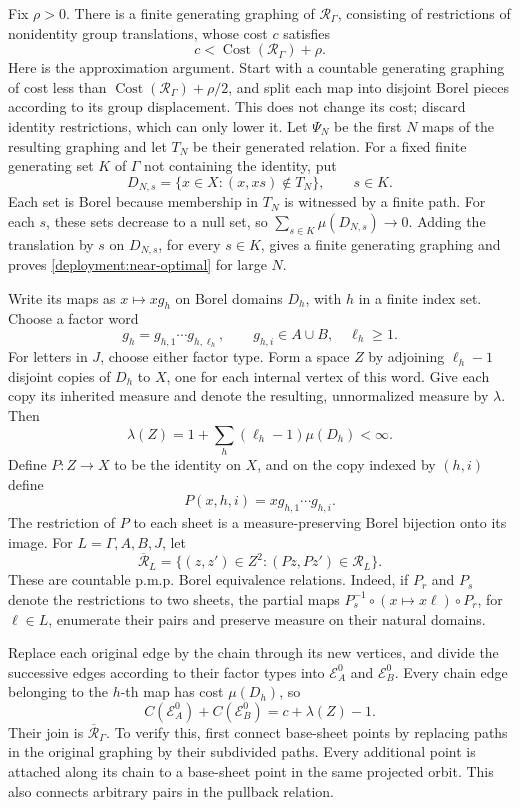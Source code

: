 Fix \(\rho>0\).  There is a finite generating graphing of
\(\mathcal R_\Gamma\), consisting of restrictions of nonidentity group
translations, whose cost \(c\) satisfies
\begin{equation}
\label{deployment:near-optimal}
 c<\operatorname{Cost}(\mathcal R_\Gamma)+\rho.
\end{equation}
Here is the approximation argument.  Start with a countable generating
graphing of cost less than
\(\operatorname{Cost}(\mathcal R_\Gamma)+\rho/2\), and split each map
into disjoint Borel pieces according to its group displacement.  This
does not change its cost; discard identity restrictions, which can only
lower it.  Let \(\Psi_N\) be the first \(N\) maps of
the resulting graphing and let \(T_N\) be their generated relation.
For a fixed finite generating set \(K\) of \(\Gamma\) not containing
the identity, put
\[
 D_{N,s}=\{x\in X:(x,xs)\notin T_N\},\qquad s\in K.
\]
Each set is Borel because membership in \(T_N\) is witnessed by a
finite path.  For each \(s\), these sets decrease to a null set, so
\(\sum_{s\in K}\mu(D_{N,s})\to0\).  Adding the translation by \(s\)
on \(D_{N,s}\), for every \(s\in K\), gives a finite generating
graphing and proves \eqref{deployment:near-optimal} for large \(N\).

Write its maps as \(x\mapsto xg_h\) on Borel domains \(D_h\), with
\(h\) in a finite index set.  Choose a factor
word
\[
 g_h=g_{h,1}\cdots g_{h,\ell_h},\qquad
 g_{h,i}\in A\cup B,\quad \ell_h\geq1.
\]
For letters in \(J\), choose either factor type.  Form a space \(Z\)
by adjoining \(\ell_h-1\) disjoint copies of \(D_h\) to \(X\), one
for each internal vertex of this word.  Give each copy its inherited
measure and denote the resulting, unnormalized measure by \(\lambda\).
Then
\[
 \lambda(Z)=1+\sum_h(\ell_h-1)\mu(D_h)<\infty.
\]
Define \(P:Z\to X\) to be the identity on \(X\), and on the copy
indexed by \((h,i)\) define
\[
 P(x,h,i)=xg_{h,1}\cdots g_{h,i}.
\]
The restriction of \(P\) to each sheet is a measure-preserving Borel
bijection onto its image.  For \(L=\Gamma,A,B,J\), let
\[
 \overline{\mathcal R}_L
   =\{(z,z')\in Z^2:(Pz,Pz')\in\mathcal R_L\}.
\]
These are countable p.m.p. Borel equivalence relations.  Indeed, if
\(P_r\) and \(P_s\) denote the restrictions to two sheets, the partial
maps \(P_s^{-1}\circ(x\mapsto x\ell)\circ P_r\), for \(\ell\in L\),
enumerate their pairs and preserve measure on their natural domains.

Replace each original edge by the chain through its new vertices, and
divide the successive edges according to their factor types into
\(\mathcal E_A^0\) and \(\mathcal E_B^0\).  Every chain edge belonging
to the \(h\)-th map has cost \(\mu(D_h)\), so
\begin{equation}
\label{deployment:initial-cost}
 C(\mathcal E_A^0)+C(\mathcal E_B^0)
   =c+\lambda(Z)-1.
\end{equation}
Their join is \(\overline{\mathcal R}_\Gamma\).  To verify this,
first connect base-sheet points by replacing paths in the original
graphing by their subdivided paths.  Every additional point is attached
along its chain to a base-sheet point in the same projected orbit.
This also connects arbitrary pairs in the pullback relation.

